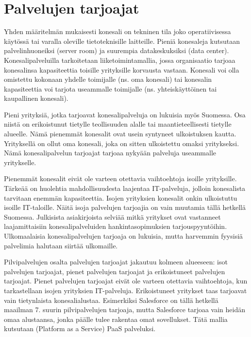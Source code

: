 \section{Palvelujen tarjoajat}
Yhden määritelmän mukaisesti konesali on tekninen tila joko operatiivisessa käytössä tai varalla oleville tietoteknisille laitteille. Pieniä konesaleja kutsutaan palvelinhuoneiksi (server room) ja suurempia datakeskuksiksi (data center). Konesalipalveluilla tarkoitetaan liiketoimintamallia, jossa organisaatio tarjoaa konesalinsa kapasiteettia toisille yrityksille korvausta vastaan. Konesali voi olla omistettu kokonaan yhdelle toimijalle (ns. oma konesali) tai konesalin kapasiteettia voi tarjota useammalle toimijalle (ns. yhteiskäyttöinen tai kaupallinen konesali).\citep{itewiki}

Pieni yrityksiä, jotka tarjoavat konesalipalveluja on lukuisia myös Suomessa. Osa niistä on erikoistunut tietylle teollisuuden alalle tai maantieteellisesti tietylle alueelle. Nämä pienemmät konesalit ovat usein syntyneet ulkoistuksen kautta. Yrityksellä on ollut oma konesali, joka on sitten ulkoistettu omaksi yritykseksi. Nämä konesalipalvelun tarjoajat tarjoaa nykyään palveluja useammalle yritykselle.\citep{tnnet} 

Pienemmät konesalit eivät ole varteen otettavia vaihtoehtoja isoille yrityksille. Tärkeää on huolehtia mahdollisuudesta laajentaa IT-palveluja, jolloin konesalista tarvitaan enemmän kapasiteettia. Isojen yrityksien konesalit onkin ulkoistuttu isoille IT-taloille. Näitä isoja palvelujen tarjoajia on vain muutamia tällä hetkellä Suomessa. Julkisista asiakirjoista selviää mitkä yritykset ovat vastanneet laajamittaisiin konesalipalveluiden hankintasopimuksien tarjouspyyntöihin.\citep{nurmijarvi} Ulkomaalaisia konesalipalvelujen tarjoaja on lukuisia, mutta harvemmin fyysisiä palvelimia halutaan siirtää ulkomaille.

Pilvipalvelujen osalta palvelujen tarjoajat jakautuu kolmeen alueeseen: isot palvelujen tarjoajat, pienet palvelujen tarjoajat ja erikoistuneet palvelujen tarjoajat. Pienet palvelujen tarjoajat eivät ole varteen otettavia vaihtoehtoja, kun tarkastellaan isojen yrityksien IT-palveluja. Erikoistuneet yritykset taas tarjoavat vain tietynlaista konesalialustaa. Esimerkiksi Salesforce on tällä hetkellä maailman 7. suurin pilvipalvelujen tarjoaja, mutta Salesforce tarjoaa vain heidän omaa alustaansa, jonka päälle tulee rakentaa omat sovellukset. Tätä mallia kutsutaan (Platform as a Service) PaaS palveluksi.\citep{top_cloud}
